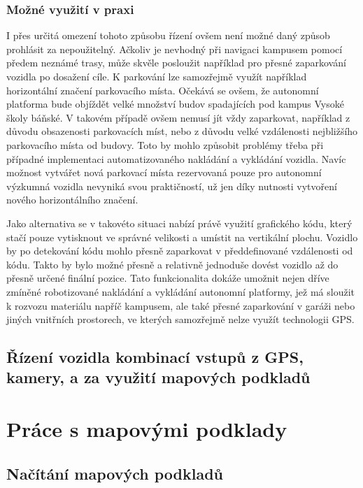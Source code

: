 \documentclass[czech, bachelor]{diploma}
\begin{document}
\subsection{Možné využití v praxi}

I přes určitá omezení tohoto způsobu řízení ovšem není možné daný způsob prohlásit za nepoužitelný. Ačkoliv je nevhodný 
při navigaci kampusem pomocí předem neznámé trasy, může skvěle posloužit například pro přesné zaparkování vozidla po dosažení 
cíle. K parkování lze samozřejmě využít například horizontální značení parkovacího místa. Očekává se ovšem, že autonomní platforma
bude objíždět velké množství budov spadajících pod kampus Vysoké školy báňské. V takovém případě ovšem nemusí jít vždy zaparkovat,
například z důvodu obsazenosti parkovacích míst, nebo z důvodu velké vzdálenosti nejbližšího parkovacího místa od budovy. Toto by
mohlo způsobit problémy třeba při případné implementaci automatizovaného nakládání a vykládání vozidla. Navíc možnost vytvářet 
nová parkovací místa rezervovaná pouze pro autonomní výzkumná vozidla nevyniká svou praktičností, už jen díky nutnosti vytvoření
nového horizontálního značení.

Jako alternativa se v takovéto situaci nabízí právě využití grafického kódu, který stačí pouze vytisknout ve správné velikosti 
a umístit na vertikální plochu. Vozidlo by po detekování kódu mohlo přesně zaparkovat v předdefinované vzdálenosti od kódu. Takto
by bylo možné přesně a relativně jednoduše dovést vozidlo až do přesně určené finální pozice. Tato funkcionalita dokáže umožnit
nejen dříve zmíněné robotizované nakládání a vykládání autonomní platformy, jež má sloužit k rozvozu materiálu napříč kampusem,
ale také přesné zaparkování v garáži nebo jiných vnitřních prostorech, ve kterých samozřejmě nelze využít technologii GPS.

\section{Řízení vozidla kombinací vstupů z GPS, kamery, a za využití mapových podkladů} \label{combination-of-driving-inputs}

\chapter{Práce s mapovými podklady} \label{osm-chapter}

\section{Načítání mapových podkladů}
\end{document}
